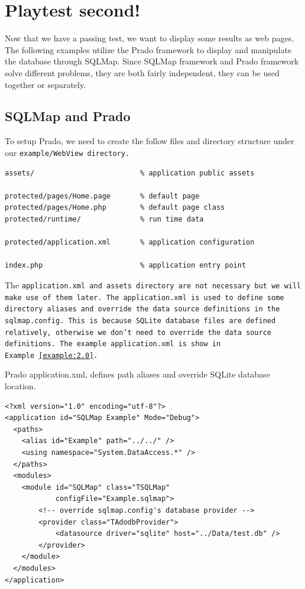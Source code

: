 \section{Playtest second!}
Now that we have a passing test, we want to display some results as web pages.
The following examples utilize the Prado framework to display and manipulate
the database through SQLMap. Since SQLMap framework and Prado framework solve
different problems, they are both fairly independent, they can be used
together or separately.

\subsection{SQLMap and Prado}
To setup Prado, we need to create the follow files and directory structure
under our \tt{example/WebView} directory.
\begin{verbatim}
assets/                         % application public assets

protected/pages/Home.page       % default page
protected/pages/Home.php        % default page class
protected/runtime/              % run time data

protected/application.xml       % application configuration

index.php                       % application entry point
\end{verbatim}

The \tt{application.xml} and \tt{assets} directory are not necessary but we
will make use of them later. The \tt{application.xml} is used to define some
directory aliases and override the data source definitions in the
\tt{sqlmap.config}. This is because SQLite database files are defined
relatively, otherwise we don't need to override the data source definitions.
The example \tt{application.xml} is show in Example~\ref{example:2.0}.

\begin{example}\label{example:2.0}
Prado application.xml, defines path aliases and override SQLite database
location.
\begin{verbatim}
<?xml version="1.0" encoding="utf-8"?>
<application id="SQLMap Example" Mode="Debug">
  <paths>
    <alias id="Example" path="../../" />
    <using namespace="System.DataAccess.*" />
  </paths>
  <modules>
    <module id="SQLMap" class="TSQLMap"
            configFile="Example.sqlmap">
        <!-- override sqlmap.config's database provider -->
        <provider class="TAdodbProvider">
            <datasource driver="sqlite" host="../Data/test.db" />
        </provider>
    </module>
  </modules>
</application>
\end{verbatim}
\end{example}

